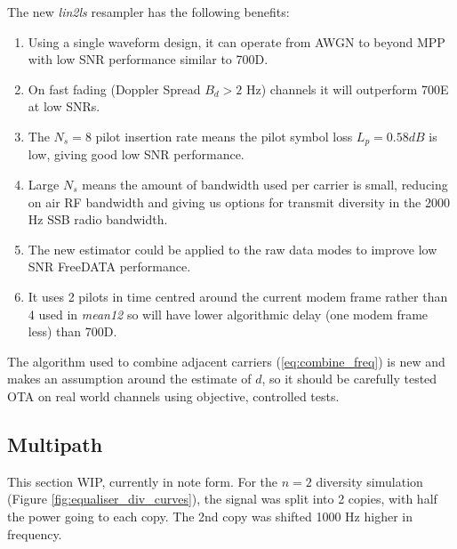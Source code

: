 \documentclass{article}
\begin{document}
The new \emph{lin2ls} resampler has the following benefits:
\begin{enumerate}
\item Using a single waveform design, it can operate from AWGN to beyond MPP with low SNR performance similar to 700D.
\item On fast fading (Doppler Spread $B_d>2$ Hz) channels it will outperform 700E at low SNRs.
\item The $N_s=8$ pilot insertion rate means the pilot symbol loss $L_p=0.58 \si{dB}$ is low, giving good low SNR performance.
\item Large $N_s$ means the amount of bandwidth used per carrier is small, reducing on air RF bandwidth and giving us options for transmit diversity in the 2000 Hz SSB radio bandwidth.
\item The new estimator could be applied to the raw data modes to improve low SNR FreeDATA performance.
\item It uses 2 pilots in time centred around the current modem frame rather than 4 used in \emph{mean12} so will have lower algorithmic delay (one modem frame less) than 700D.
\end{enumerate}	

The algorithm used to combine adjacent carriers (\ref{eq:combine_freq}) is new and makes an assumption around the estimate of $d$, so it should be carefully tested OTA on real world channels using objective, controlled tests.

\subsection{Multipath}

This section WIP, currently in note form. For the $n=2$ diversity simulation (Figure \ref{fig:equaliser_div_curves}), the signal was split into 2 copies, with half the power going to each copy.  The 2nd copy was shifted 1000 Hz higher in frequency.
\end{document}
